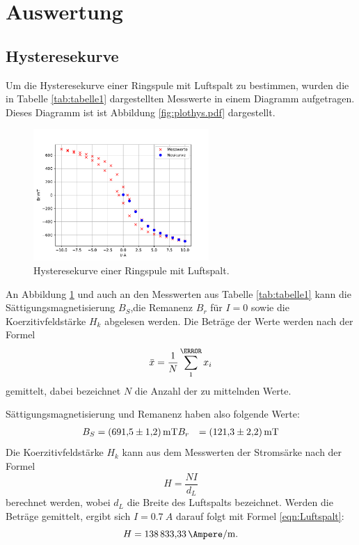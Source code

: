 \section{Auswertung}

\subsection{Hysteresekurve}
Um die Hysteresekurve einer Ringspule mit Luftspalt zu
bestimmen, wurden die in Tabelle \ref{tab:tabelle1}
dargestellten Messwerte in einem Diagramm aufgetragen.
Dieses Diagramm ist ist Abbildung \ref{fig:plothys.pdf}
dargestellt.

\begin{figure}
  \centering
  \includegraphics[height=5cm]{plothys.pdf}
  \caption{Hysteresekurve einer Ringspule mit Luftspalt.}
  \label{fig:plothys}
\end{figure}
An Abbildung \ref{fig:plothys} und auch an den Messwerten
aus Tabelle \ref{tab:tabelle1} kann die
Sättigungsmagnetisierung $B_{S}$,die Remanenz
$B_{r}$ für $I=0$ sowie die Koerzitivfeldstärke
$H_{k}$ abgelesen werden.
Die Beträge der Werte werden nach der Formel
\begin{equation}
  \bar{x}=\frac{1}{N}\sum_{1}^\N x_{i}
  \label{eqn:mittel}
\end{equation}
gemittelt, dabei bezeichnet $N$ die Anzahl der zu
mittelnden Werte.

Sättigungsmagnetisierung und Remanenz haben also folgende
Werte:
\begin{align*}
  B_{S} &=\SI{691,5(12)}{\mT}
  B_{r} &=\SI{121.3(22)}{\mT}
\end{align*}
Die Koerzitivfeldstärke $H_{k}$ kann aus dem Messwerten
der Stromsärke nach der Formel
\begin{equation}
  H=\frac{NI}{d_{L}}
  \label{eqn:Luftspalt}
\end{equation}
berechnet werden, wobei $d_{L}$ die Breite des Luftspalts
bezeichnet.
Werden die Beträge gemittelt, ergibt sich $I=\SI{0.7}{A}$
darauf folgt mit Formel \ref{eqn:Luftspalt}:
\begin{equation*}
  H=\SI{138833,33}{\Ampere\per\meter}.
\end{equation*}

